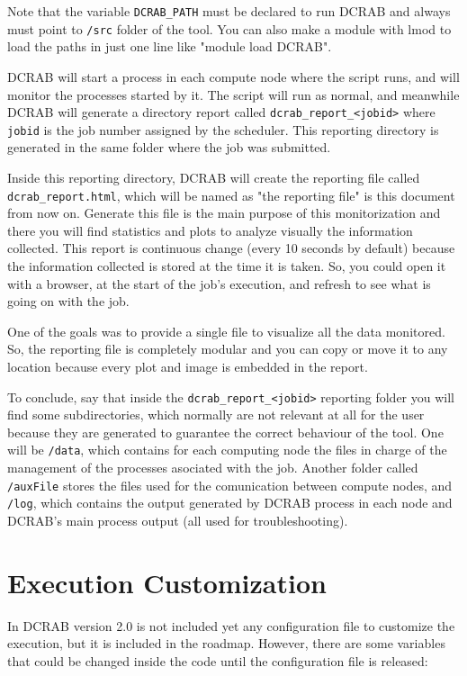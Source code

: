 \documentclass[10pt,a4paper]{report}
\begin{document}
Note that the variable \verb+DCRAB_PATH+ must be declared to run DCRAB and always must point to \verb+/src+ folder of the tool. You can also make a module with lmod to load the paths in just one line like "module load DCRAB".

DCRAB will start a process in each compute node where the script runs, and will monitor the processes started by it. The script will run as normal, and meanwhile DCRAB will generate a directory report called \verb+dcrab_report_<jobid>+ where \verb+jobid+ is the job number assigned by the scheduler. This reporting directory is generated in the same folder where the job was submitted.

\sloppy Inside this reporting directory, DCRAB will create the reporting file called \verb+dcrab_report.html+, which will be named as "the reporting file" is this document from now on. Generate this file is the main purpose of this monitorization and there you will find statistics and plots to analyze visually the information collected. This report is continuous change (every 10 seconds by default) because the information collected is stored at the time it is taken. So, you could open it with a browser, at the start of the job's execution, and refresh to see what is going on with the job.

One of the goals was to provide a single file to visualize all the data monitored. So, the reporting file is completely modular and you can copy or move it to any location because every plot and image is embedded in the report.

To conclude, say that inside the \verb+dcrab_report_<jobid>+ reporting folder you will find some subdirectories, which normally are not relevant at all for the user because they are generated to guarantee the correct behaviour of the tool. One will be \verb+/data+, which contains for each computing node the files in charge of the management of the processes asociated with the job. Another folder called \verb+/auxFile+ stores the files used for the comunication between compute nodes, and \verb+/log+, which contains the output generated by DCRAB process in each node and DCRAB's main process output (all used for troubleshooting).

\section{Execution Customization}

In DCRAB version 2.0 is not included yet any configuration file to customize the execution, but it is included in the roadmap. However, there are some variables that could be changed inside the code until the configuration file is released:
\end{document}
